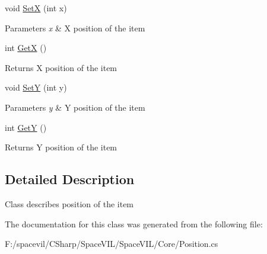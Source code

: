 \begin{DoxyCompactItemize}
\item 
\mbox{\label{class_space_v_i_l_1_1_core_1_1_position_a36efdbd80c4028b3aaff4a289e6fccbf}} 
void \mbox{\hyperlink{class_space_v_i_l_1_1_core_1_1_position_a36efdbd80c4028b3aaff4a289e6fccbf}{SetX}} (int x)
\begin{DoxyCompactList}\small\item\em 
\begin{DoxyParams}{Parameters}
{\em x} & X position of the item \\
\hline
\end{DoxyParams}
\end{DoxyCompactList}\item 
\mbox{\label{class_space_v_i_l_1_1_core_1_1_position_a3233aa0f692ff65e3d930e2e25fc1832}} 
int \mbox{\hyperlink{class_space_v_i_l_1_1_core_1_1_position_a3233aa0f692ff65e3d930e2e25fc1832}{GetX}} ()
\begin{DoxyCompactList}\small\item\em \begin{DoxyReturn}{Returns}
X position of the item 
\end{DoxyReturn}
\end{DoxyCompactList}\item 
\mbox{\label{class_space_v_i_l_1_1_core_1_1_position_a014b1cf241575d54429f92c730d66199}} 
void \mbox{\hyperlink{class_space_v_i_l_1_1_core_1_1_position_a014b1cf241575d54429f92c730d66199}{SetY}} (int y)
\begin{DoxyCompactList}\small\item\em 
\begin{DoxyParams}{Parameters}
{\em y} & Y position of the item \\
\hline
\end{DoxyParams}
\end{DoxyCompactList}\item 
\mbox{\label{class_space_v_i_l_1_1_core_1_1_position_aa1fec9620d358e197516fc6e81938a9f}} 
int \mbox{\hyperlink{class_space_v_i_l_1_1_core_1_1_position_aa1fec9620d358e197516fc6e81938a9f}{GetY}} ()
\begin{DoxyCompactList}\small\item\em \begin{DoxyReturn}{Returns}
Y position of the item 
\end{DoxyReturn}
\end{DoxyCompactList}\end{DoxyCompactItemize}


\subsection{Detailed Description}
Class describes position of the item 



The documentation for this class was generated from the following file\+:\begin{DoxyCompactItemize}
\item 
F\+:/spacevil/\+C\+Sharp/\+Space\+V\+I\+L/\+Space\+V\+I\+L/\+Core/Position.\+cs\end{DoxyCompactItemize}
